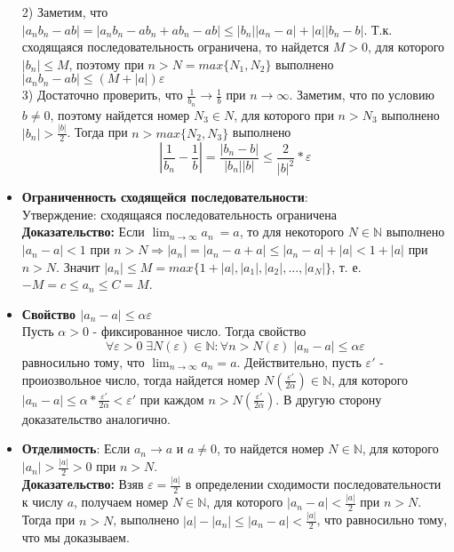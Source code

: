 \documentclass[12pt,a4paper]{article}
\begin{document}
\begin{itemize}
    2) Заметим, что $|a_n b_n - a b| = |a_n b_n - a b_n + a b_n - a b| \leq |b_n| |a_n - a| + |a| |b_n - b|$. Т.к. сходящаяся последовательность ограничена, то найдется $M > 0$, для которого $|b_n| \leq M$, поэтому при  $n > N = max\{ N_1, N_2\}$ выполнено $|a_n b_n - a b| \leq (M + |a|)\varepsilon$\\
    3) Достаточно проверить, что $\frac{1}{b_n} \to \frac{1}{b}$ при $n \to \infty$. Заметим, что по условию $b \neq 0$, поэтому найдется номер $N_3 \in N$, для которого при $n > N_3$ выполнено $|b_n| > \frac{|b|}{2}$. Тогда при $n > max \{N_2, N_3\}$ выполнено \[|\frac{1}{b_n} - \frac{1}{b}| = \frac{|b_n - b|}{|b_n| |b|} \leq \frac{2}{|b|^2} * \varepsilon\]
    \item \textbf{Ограниченность сходящейся последовательности}:\\
    Утверждение: сходящаяся последовательность ограничена\\
    \textbf{Доказательство:} Если $\lim_{n \to \infty} a_n\ = a$, то для некоторого $N \in \mathbb{N}$ выполнено  
    $|a_n - a| < 1$ при $n > N  \Rightarrow |a_n| = |a_n - a + a| \leq |a_n - a| + |a| < 1 + |a|$ при $n > N$.
    Значит $|a_n| \leq M = max\{1 + |a|, |a_1|, |a_2|, ..., |a_N|\}$, т. е. $-M = c \leq a_n \leq C = M$.
    
	\item \textbf{Свойство $|a_n - a| \leq \alpha\varepsilon$} \\
	Пусть $\alpha > 0$ - фиксированное число. Тогда свойство
	\[
	\forall \varepsilon > 0 \; \exists N(\varepsilon) \in \mathbb{N}: \forall n > N(\varepsilon) \; |a_n - a| \leq \alpha \varepsilon	
	\]
	равносильно тому, что $\lim_{n \to \infty}{a_n} = a$. Действительно, пусть $\varepsilon'$ - проиозвольное число, тогда найдется номер $N(\frac{\varepsilon'}{2\alpha}) \in \mathbb{N}$, для которого $|a_n - a| \leq \alpha * \frac{\varepsilon'}{2\alpha} < \varepsilon'$ при каждом $n > N(\frac{\varepsilon'}{2\alpha})$. В другую сторону доказательство аналогично.
    
    \item \textbf{Отделимость}:
    Если $a_n \to a$ и $a \neq 0$, то найдется номер $N \in \mathbb{N}$, для которого $|a_n| > \frac{|a|}{2} > 0$ при $n > N$.\\
    \textbf{Доказательство:} Взяв $\varepsilon = \frac{|a|}{2}$ в определении сходимости последовательности к числу $a$, получаем номер $N \in \mathbb{N}$, для которого $|a_n - a| < \frac{|a|}{2}$ при $n > N$. Тогда при $n > N$, выполнено $|a| - |a_n| \leq |a_n - a| < \frac{|a|}{2}$, что равносильно тому, что мы доказываем.
  
\end{itemize}
\end{document}
